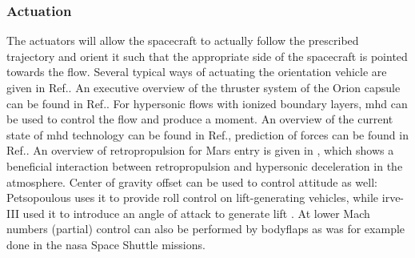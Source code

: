 \subsubsection{Actuation}
The actuators will allow the spacecraft to actually follow the prescribed trajectory and orient it such that the appropriate side of the spacecraft is pointed towards the flow. Several typical ways of actuating the orientation vehicle are given in Ref.\cite{Wertz2011}. An executive overview of the thruster system of the Orion capsule can be found in Ref.\cite{Jones2012}. For hypersonic flows with ionized boundary layers, \gls{mhd} can be used to control the flow and produce a moment. An overview of the current state of \gls{mhd} technology can be found in Ref.\cite{Braun2009}, prediction of forces can be found in Ref.\cite{Kawamura2013}. An overview of retropropulsion for Mars entry is given in \cite{Korzun2009}, which shows a beneficial interaction between retropropulsion and hypersonic deceleration in the atmosphere. Center of gravity offset can be used to control attitude as well: Petsopoulous \cite{Petsopoulos1996} uses it to provide roll control on lift-generating vehicles, while \gls{irve}-III used it to introduce an angle of attack to generate lift \cite{Dillman2012a}. At lower Mach numbers (partial) control can also be performed by bodyflaps as was for example done in the \gls{nasa} Space Shuttle missions.